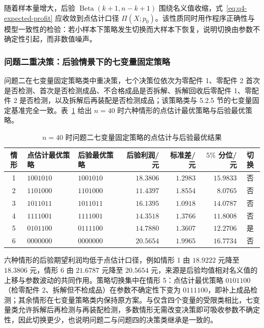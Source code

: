 随着样本量增大，后验 $\operatorname{Beta}(k+1,n-k+1)$ 围绕名义值收缩，式~\eqref{eq:q4-expected-profit} 应收敛到点估计口径 $\Pi(X;p_0)$。该性质同时用作程序正确性与模型一致性的检验：若小样本下策略发生切换而大样本下恢复，说明切换由参数不确定性引起，而非数值噪声。

\subsubsection{问题二重决策：后验情景下的七变量固定策略}

问题二在七变量固定策略类中重决策，七个决策位依次为零配件 1、零配件 2 首次是否检测、首次是否检测成品、不合格成品是否拆解、拆解回收后零配件 1、零配件 2 是否检测，以及拆解后再装配是否检测成品；该策略类与 5.2.5 节的七变量固定基准完全一致。表~\ref{tab:q4-q2} 给出 $n=40$ 时六种情形的点估计最优策略与后验最优策略。

\begin{table}[H]
  \centering
  \caption{$n=40$ 时问题二七变量固定策略的点估计与后验最优结果}
  \label{tab:q4-q2}
  \small
  \begin{tabular}{c>{\raggedright\arraybackslash}p{}>{\raggedright\arraybackslash}p{}rrrc}
    \toprule
    情形 & 点估计最优策略 & 后验最优策略 & 后验利润/元 & 标准差/元 & $5\%$ 分位/元 & 切换 \\
    \midrule
    1 & $1001010$ & $1001010$ & $18.3806$ & $1.2983$ & $15.9833$ & 否 \\
    2 & $1101000$ & $1101000$ & $11.4397$ & $1.8554$ & $8.0765$ & 否 \\
    3 & $1011011$ & $1011011$ & $16.1395$ & $1.0918$ & $14.0787$ & 否 \\
    4 & $1111001$ & $1111001$ & $14.3518$ & $1.3766$ & $11.8008$ & 否 \\
    5 & $0101100$ & $0111100$ & $14.7880$ & $1.3607$ & $12.2706$ & 是 \\
    6 & $0000000$ & $0000000$ & $20.5654$ & $1.9965$ & $16.7734$ & 否 \\
    \bottomrule
  \end{tabular}
\end{table}

六种情形的后验期望利润均低于点估计口径，例如情形 1 由 $18.9222$ 元降至 $18.3806$ 元，情形 6 由 $21.6787$ 元降至 $20.5654$ 元，来源是后验均值相对名义值的上移与参数波动的共同作用。策略切换集中在情形 5：点估计最优策略 $0101100$（检零配件 2、拆解但不检成品）在参数不确定性下变为 $0111100$，即补上成品检测；其余情形在七变量策略类内保持原方案。与仅含四个变量的受限类相比，七变量类允许拆解后再检测与再装配检测，多数情形无需改变决策即可吸收参数不确定性，因此切换更少，也说明问题二与问题四的决策类继承是一致的。

